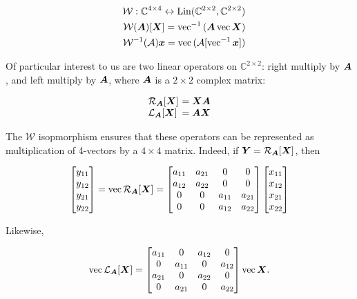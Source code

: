 \documentclass[useAMS,usenatbib]{mn2e}
\makeatletter
\newcommand{\COMPLEX}{\mathbb{C}}
\newcommand{\mat}[1]{{\bmath{#1}}}
\newcommand{\Matrix}[2]{\left [ \begin{array}{@{}#1@{}}#2\end{array} \right ]}
\newcommand{\Rop}[1]{\mathcal{R}_{{#1}}}
\newcommand{\Lop}[1]{\mathcal{L}_{{#1}}}
\makeatother
\begin{document}
\begin{eqnarray}
&& \mathcal{W}:\COMPLEX^{4\times4}\leftrightarrow\mathrm{Lin}(\COMPLEX^{2\times2},\COMPLEX^{2\times2}) \nonumber\\
&& \mathcal{W}(\mat{A})[\mat{X}] = \VECINV{(\mat{A}\,\VEC{\mat{X}})} \nonumber \\
&& \mathcal{W}^{-1}(\mathcal{A})\bmath{x} = \VEC{(\mathcal{A}[ \VECINV{\bmath{x}} ])} \label{eq:iso:W}
\end{eqnarray}

Of particular interest to us are two linear operators on $\COMPLEX^{2\times2}$: right multiply by $\mat{A}$, and left multiply by $\mat{A}$, where $\mat{A}$ is a $2\times2$ complex matrix:

\[
\begin{array}{l@{~}l}
\Rop{\mat{A}}[\mat{X}] &= \mat{XA} \\
\Lop{\mat{A}}[\mat{X}] &= \mat{AX} \\
\end{array}
\]

The $\mathcal{W}$ isopmorphism ensures that these operators can be represented as multiplication of 4-vectors 
by a $4\times4$ matrix. Indeed, if $\mat{Y}=\Rop{\mat{A}}[\mat{X}]$, then 

\begin{equation}
\Matrix{c}{y_{11}\\y_{12}\\y_{21}\\y_{22}} = \VEC{\Rop{\mat{A}}[\mat{X}]} = 
\Matrix{cccc}{a_{11}&a_{21}&0&0 \\ a_{12}&a_{22}&0&0 \\ 0&0&a_{11}&a_{21} \\ 0&0&a_{12}&a_{22} }
\Matrix{c}{x_{11}\\x_{12}\\x_{21}\\x_{22}} 
\end{equation}

Likewise, 

\begin{equation}
\VEC{\Lop{\mat{A}}[\mat{X}]} = 
\Matrix{cccc}{a_{11}&0&a_{12}&0 \\ 0&a_{11}&0&a_{12} \\ a_{21}&0&a_{22}&0  \\ 0&a_{21}&0&a_{22} }
\VEC{\mat{X}}.
\end{equation}

\end{document}

